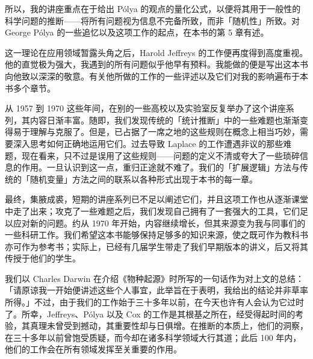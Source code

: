 所以，我的讲座重点在于给出 Pólya 的观点的量化公式，以便将其用于一般性的科学问题的推断——将所有问题视为信息不完备所致，而非「随机性」所致。对 George Pólya 的一些追忆以及这项工作的起点，在本书的第 5 章有述。

这一理论在应用领域暂露头角之后，Harold Jeffreys 的工作便再度得到高度重视。他的直觉极为强大，我遇到的所有问题似乎他早有预料。我能做的便是写出这本书向他致以深深的敬意。有关他所做的工作的一些评述以及它们对我的影响遍布于本书多个章节。

从 1957 到 1970 这些年间，在别的一些高校以及实验室反复举办了这个讲座系列，其内容日渐丰富。随即，我们发现传统的「统计推断」中的一些难题也渐渐变得易于理解与克服了。但是，已占据了一席之地的这些规则在概念上相当巧妙，需要深入思考如何正确地运用它们。过去导致 Laplace 的工作遭遇非议的那些难题，现在看来，只不过是误用了这些规则——问题的定义不清或夸大了一些琐碎信息的作用。一旦认识到这一点，重归正途就不难了。我们的「扩展逻辑」方法与传统的「随机变量」方法之间的联系以各种形式出现于本书的每一章。

最终，集腋成裘，短期的讲座系列已不足以阐述它们，并且这项工作也从逐渐课堂中走了出来；攻克了一些难题之后，我们发现自己拥有了一套强大的工具，它们足以应对新的问题。约从 1970 年开始，内容继续增长，但其来源变为我与同事们的一些科研工作。我们希望这本书能够保持足够多的知识来源，使之既可作为教科书亦可作为参考书；实际上，已经有几届学生带走了我们早期版本的讲义，后又将其传授于他们的学生。

我们以 Charles Darwin 在介绍《物种起源》时所写的一句话作为对上文的总结：「请原谅我一开始便讲述这些个人事宜，此举旨在于表明，我给出的结论并非草率所得。」不过，由于我们的工作始于三十多年以前，在今天也许有人会认为它过时了。所幸，Jeffreys、Pólya 以及 Cox 的工作是其根基之所在，经受得起时间的考验，其真理未曾受到撼动，其重要性却与日俱增。在推断的本质上，他们的洞察，在三十多年以前曾饱受质疑，而今却在诸多科学领域大行其道；此后 100 年内，他们的工作会在所有领域发挥至关重要的作用。